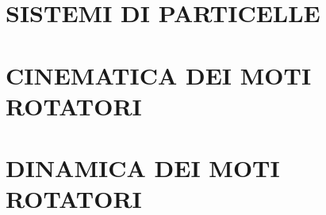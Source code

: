\documentclass{article}
\begin{document}
	\section{SISTEMI DI PARTICELLE}
		\begin{multicols}{2}
\begin{comment}
			\begin{equation}  \end{equation}
			\begin{equation}  \end{equation}
			\begin{equation}  \end{equation}
			\begin{equation}  \end{equation}
\end{comment}
		\end{multicols}
	\section{CINEMATICA DEI MOTI ROTATORI}
		\begin{multicols}{2}
\begin{comment}
			\begin{equation}  \end{equation}
			\begin{equation}  \end{equation}
			\begin{equation}  \end{equation}
			\begin{equation}  \end{equation}
\end{comment}
		\end{multicols}
	\section{DINAMICA DEI MOTI ROTATORI}
		\begin{multicols}{2}
\begin{comment}
			\begin{equation}  \end{equation}
			\begin{equation}  \end{equation}
			\begin{equation}  \end{equation}
			\begin{equation}  \end{equation}
\end{comment}
		\end{multicols}
\end{document}
